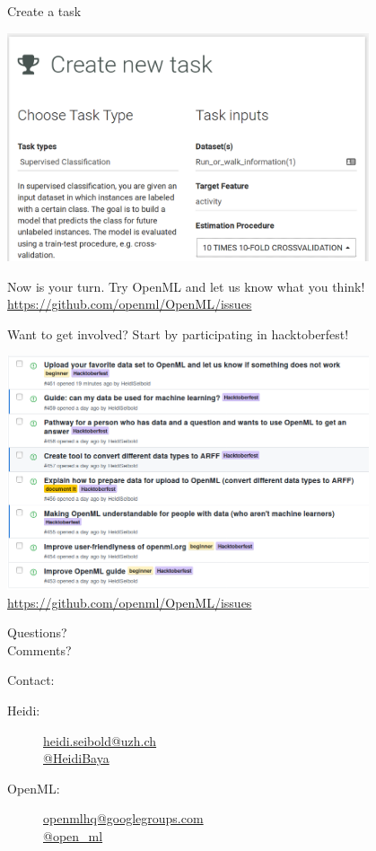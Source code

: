 \documentclass{beamer}
\begin{document}
\begin{frame}[fragile]{Create a task}
\begin{center}
\includegraphics[width = 0.8\textwidth]{add_task2}
\end{center}
\end{frame}

\begin{frame}[fragile]{}
\begin{center}
\Large Now is your turn. Try OpenML and let us know what you think!\\[2em]
\url{https://github.com/openml/OpenML/issues}
\end{center}
\end{frame}


\begin{frame}[fragile]{Want to get involved?}
Start by participating in hacktoberfest!
\begin{center}
\includegraphics[width = 0.8\textwidth]{issues}\\
\url{https://github.com/openml/OpenML/issues}
\end{center}
\end{frame}

\begin{frame}[fragile]{}
\begin{center}
\Large
Questions?\\
Comments?\\[3em]
\end{center}
Contact:\\
\begin{description}
 \item[Heidi:] \url{heidi.seibold@uzh.ch}\\ \url{@HeidiBaya}\\
 \item[OpenML:] \url{openmlhq@googlegroups.com}\\ \url{@open_ml}\\
\end{description}
\end{frame}
\end{document}
